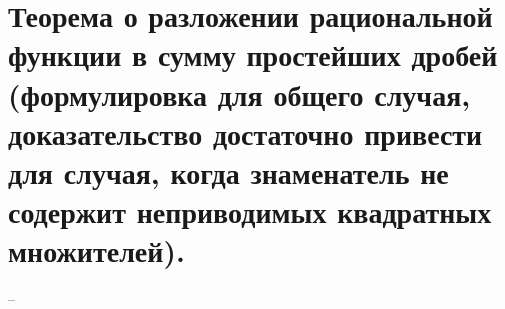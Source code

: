 \section{Теорема о разложении рациональной функции в сумму простейших дробей (формулировка для общего случая, доказательство достаточно привести для случая, когда знаменатель не содержит неприводимых квадратных множителей).}
--
\newline